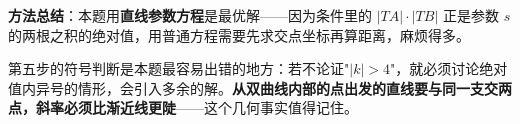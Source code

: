 \begin{answer}
\begin{gktip}
\textbf{方法总结}：本题用\textbf{直线参数方程}是最优解——因为条件里的 $|TA|\cdot|TB|$ 正是参数 $s$ 的两根之积的绝对值，用普通方程需要先求交点坐标再算距离，麻烦得多。

第五步的符号判断是本题最容易出错的地方：若不论证"$|k|>4$"，就必须讨论绝对值内异号的情形，会引入多余的解。\textbf{从双曲线内部的点出发的直线要与同一支交两点，斜率必须比渐近线更陡}——这个几何事实值得记住。
\end{gktip}



\par\medskip

\end{answer}
